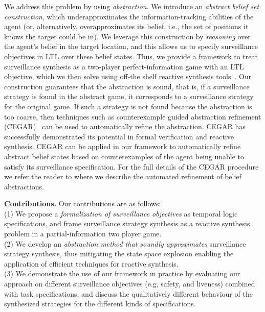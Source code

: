 We address this problem by using \emph{abstraction}. We introduce an \emph{abstract belief set construction}, which underapproximates the information-tracking abilities of the agent (or, alternatively, overapproximates its belief, i.e., the set of positions it knows the target could be in). We leverage this construction by \emph{reasoning} over the agent's belief in the target location, and this allows us to specify surveillance objectives in LTL over these belief states. Thus, we provide a framework to treat surveillance synthesis as a two-player perfect-information game with an LTL objective, which we then solve using off-the shelf reactive synthesis tools~\cite{EhlersR16}. Our construction guarantees that the abstraction is sound, that is, if a surveillance strategy is found in the abstract game, it corresponds to a surveillance strategy for the original game. If such a strategy is not found because the abstraction is too coarse, then techniques such as counterexample guided abstraction refinement (CEGAR)~\cite{ClarkeGJLV00} can be used to automatically refine the abstraction. CEGAR has successfully demonstrated its potential in formal verification and reactive synthesis. CEGAR can be applied in our framework to automatically refine abstract belief states based on counterexamples of the agent being unable to satisfy its surveillance specification. For the full details of the CEGAR procedure we refer the reader to \cite{arxiv} where we describe the automated refinement of belief abstractions.


{\bf Contributions.} Our contributions are as follows:\\
(1) We propose a \emph{formalization of surveillance objectives} as temporal logic specifications, and frame surveillance strategy synthesis  as a reactive synthesis problem in a partial-information two player game.\\
(2) We develop an \emph{abstraction method that soundly approximates} surveillance strategy synthesis, thus mitigating the state space explosion enabling the application of efficient techniques for reactive synthesis.\\
(3) We demonstrate the use of our framework in practice by evaluating our approach on different surveillance objectives (e.g, safety, and liveness) combined with task specifications, and discuss the qualitatively different behaviour of the synthesized strategies for the different kinds of specifications.

